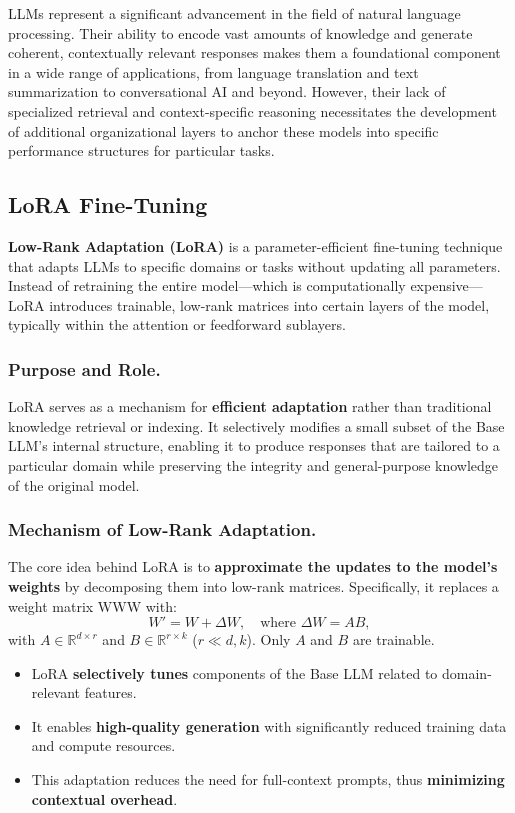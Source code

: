 \documentclass{article}
\begin{document}
LLMs represent a significant advancement in the field of natural language processing. Their ability to encode vast amounts of knowledge and generate coherent, contextually relevant responses makes them a foundational component in a wide range of applications, from language translation and text summarization to conversational AI and beyond. However, their lack of specialized retrieval and context-specific reasoning necessitates the development of additional organizational layers to anchor these models into specific performance structures for particular tasks.

\hrulefill{} 

\subsection{LoRA Fine-Tuning}
\textbf{Low-Rank Adaptation (LoRA)} is a parameter-efficient fine-tuning technique that adapts LLMs to specific domains or tasks without updating all parameters. Instead of retraining the entire model—which is computationally expensive—LoRA introduces trainable, low-rank matrices into certain layers of the model, typically within the attention or feedforward sublayers. 

\subsubsection{Purpose and Role.} LoRA serves as a mechanism for \textbf{efficient adaptation} rather than traditional knowledge retrieval or indexing. It selectively modifies a small subset of the Base LLM’s internal structure, enabling it to produce responses that are tailored to a particular domain while preserving the integrity and general-purpose knowledge of the original model.

\subsubsection{Mechanism of Low-Rank Adaptation.} The core idea behind LoRA is to \textbf{approximate the updates to the model's weights} by decomposing them into low-rank matrices. Specifically, it replaces a weight matrix WWW with:
\[
W' = W + \Delta W,\quad \text{where }\Delta W = AB,
\]
with $A\in\mathbb{R}^{d\times r}$ and $B\in\mathbb{R}^{r\times k}$ ($r\!\ll\!d,k$). Only $A$ and $B$ are trainable.

\begin{itemize}
  \item LoRA \textbf{selectively tunes} components of the Base LLM related to domain-relevant features.
  \item It enables \textbf{high-quality generation} with significantly reduced training data and compute resources.
  \item This adaptation reduces the need for full-context prompts, thus \textbf{minimizing contextual overhead}.
\end{itemize}
\end{document}
